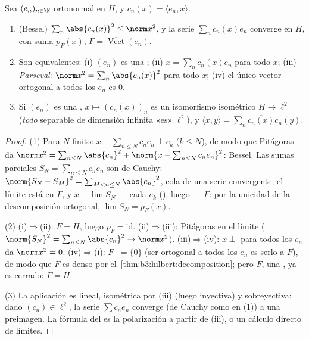 \begin{theorem}\label{thm:b3:hilbert:parseval}
Sea $(e_n)_{n\in\N}$ ortonormal en $H$, y $c_n(x) =
\langle e_n, x\rangle$.
\begin{enumerate}
  \item (Bessel) $\sum_n\abs{c_n(x)}^2 \leq \norm x^2$, y la serie
  $\sum_nc_n(x)e_n$ converge en $H$, con suma $p_F(x)$,
  $F = \overline{\operatorname{Vect}}(e_n)$. \item Son equivalentes: (i)
  $(e_n)$ es una ; (ii)
  $x = \sum_nc_n(x)e_n$ para todo $x$; (iii)
  \emph{Parseval}: $\norm x^2
        = \sum_n\abs{c_n(x)}^2$ para todo $x$; (iv) el único vector
  ortogonal a todos los $e_n$ es $0$. \item Si $(e_n)$ es una
  , $x \mapsto (c_n(x))_n$
  es un isomorfismo isométrico $H \to \ell^2$ (\emph{todo}
   separable de
  dimensión infinita «es» $\ell^2$), y $\langle x, y\rangle =
        \sum_n\overline{c_n(x)}c_n(y)$.
\end{enumerate}
\end{theorem}

\begin{proof}
(1) Para $N$ finito: $x - \sum_{n\leq N}c_ne_n \perp e_k$ ($k
\leq N$), de modo que Pitágoras da $\norm x^2 = \sum_{n\leq
N}\abs{c_n}^2 + \norm{x - \sum_{n\leq N}c_ne_n}^2$: Bessel. Las sumas
parciales $S_N = \sum_{n\leq N}c_ne_n$ son de Cauchy:
$\norm{S_N - S_M}^2 = \sum_{M<n\leq N}\abs{c_n}^2$, cola de una serie
convergente; el límite está en $F$, y $x - \lim S_N
\perp$ cada $e_k$ (),
luego $\perp F$: por la unicidad de la descomposición ortogonal,
$\lim S_N = p_F(x)$.

(2) (i)$\Rightarrow$(ii): $F = H$, luego $p_F = \mathrm{id}$.
(ii)$\Rightarrow$(iii): Pitágoras en el límite ($\norm{S_N}^2
= \sum_{n \leq N}\abs{c_n}^2 \to \norm x^2$). (iii)$\Rightarrow$(iv):
$x \perp$ para todos los $e_n$ da $\norm x^2 =
0$. (iv)$\Rightarrow$(i): $F^\perp = \{0\}$ (ser ortogonal a todos los
$e_n$ es serlo a $F$), de modo que $F$ es denso por
el~\cref{thm:b3:hilbert:decomposition}; pero $F$, una
, ya es cerrado: $F = H$.

(3) La aplicación es lineal, isométrica por (iii) (luego inyectiva) y
sobreyectiva: dado $(c_n) \in \ell^2$, la serie $\sum
c_ne_n$ converge (de Cauchy como en (1)) a una preimagen. La fórmula del
 es la polarización a
partir de (iii), o un cálculo directo de límites.
\end{proof}


